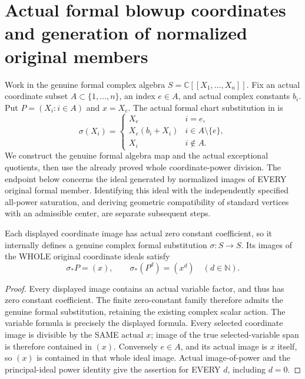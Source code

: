 \section{Actual formal blowup coordinates and generation of normalized original members}

Work in the genuine formal complex algebra $S=\mathbb C[[X_1,\ldots,X_n]]$.
Fix an actual coordinate subset $A\subset\{1,\ldots,n\}$, an index $e\in A$,
and actual complex constants $b_i$. Put $P=(X_i:i\in A)$ and $x=X_e$.
The actual formal chart substitution in
\cite[\S7, pp.~267--272, especially Lemma~7.22 and Corollary~7.24]{bierstone-milman97-invent-math}
is
\[
 \sigma(X_i)=\begin{cases}X_e&i=e,\\X_e(b_i+X_i)&i\in A\setminus\{e\},\\X_i&i\notin A.\end{cases}
\]
We construct the genuine formal algebra map and the actual exceptional
quotients, then use the already proved whole coordinate-power division.
The endpoint below concerns the ideal generated by normalized images of
EVERY original formal member. Identifying this ideal with the independently
specified all-power saturation, and deriving geometric compatibility of
standard vertices with an admissible center, are separate subsequent steps.

\begin{lemma}
\label{hir:actual-formal-blowup-coordinate-power-image}
Each displayed coordinate image has actual zero constant coefficient,
so it internally defines a genuine complex formal substitution $\sigma:S\to S$.
Its images of the WHOLE original coordinate ideals satisfy
\[
 \sigma_*P=(x),\qquad \sigma_*(P^d)=(x^d)\quad(d\in\mathbb N).
\]
\leanok
\end{lemma}
\begin{proof}
Every displayed image contains an actual variable factor, and thus has
zero constant coefficient. The finite zero-constant family therefore
admits the genuine formal substitution, retaining the existing complex
scalar action. The variable formula is precisely the displayed formula.
Every selected coordinate image is divisible by the SAME actual $x$;
image of the true selected-variable span is therefore contained in $(x)$.
Conversely $e\in A$, and its actual image is $x$ itself, so $(x)$ is
contained in that whole ideal image. Actual image-of-power and the
principal-ideal power identity give the assertion for EVERY $d$, including
$d=0$.
\end{proof}

